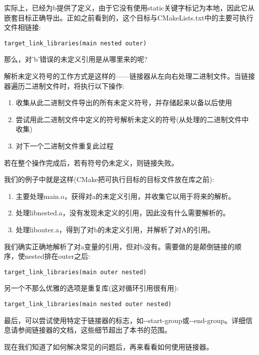 实际上，已经为b提供了定义，由于它没有使用static关键字标记为本地，因此它从嵌套目标正确导出。正如之前看到的，这个目标与CMakeLists.txt中的主要可执行文件相链接:

\begin{lstlisting}[style=styleCMake]
target_link_libraries(main nested outer)
\end{lstlisting}

那么，对'b'错误的未定义引用是从哪里来的呢?

解析未定义符号的工作方式是这样的——链接器从左向右处理二进制文件。当链接器遍历二进制文件时，将执行以下操作:

\begin{enumerate}
\item 
收集从此二进制文件导出的所有未定义符号，并存储起来以备以后使用

\item 
尝试用此二进制文件中定义的符号解析未定义的符号(从处理的二进制文件中收集)

\item 
对下一个二进制文件重复此过程
\end{enumerate}

若在整个操作完成后，若有符号仍未定义，则链接失败。

我们的例子中就是这样(CMake把可执行目标的目标文件放在库之前):

\begin{enumerate}
\item 
主要处理main.o，获得对a的未定义引用，并收集它以用于将来的解析。

\item 
处理libnested.a，没有发现未定义的引用，因此没有什么需要解析的。

\item 
处理libouter.a，得到了对b的未定义引用，并解析了对A的引用。
\end{enumerate}

我们确实正确地解析了对a变量的引用，但对b没有。需要做的是颠倒链接的顺序，使nested排在outer之后:

\begin{lstlisting}[style=styleCMake]
target_link_libraries(main outer nested)
\end{lstlisting}

另一个不那么优雅的选项是重复库(这对循环引用很有用):

\begin{lstlisting}[style=styleCMake]
target_link_libraries(main nested outer nested)
\end{lstlisting}

最后，可以尝试使用特定于链接器的标志，如-{}-start-group或-{}-end-group。详细信息请参阅链接器的文档，这些细节超出了本书的范围。

现在我们知道了如何解决常见的问题后，再来看看如何使用链接器。











